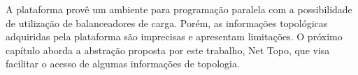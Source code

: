 A plataforma \charm provê um ambiente para programação paralela com a possibilidade de utilização de balanceadores de carga. Porém, as informações topológicas adquiridas pela plataforma são imprecisas e apresentam limitações.
O próximo capítulo aborda a abstração proposta por este trabalho, Net Topo, que visa facilitar o acesso de algumas informações de topologia.
